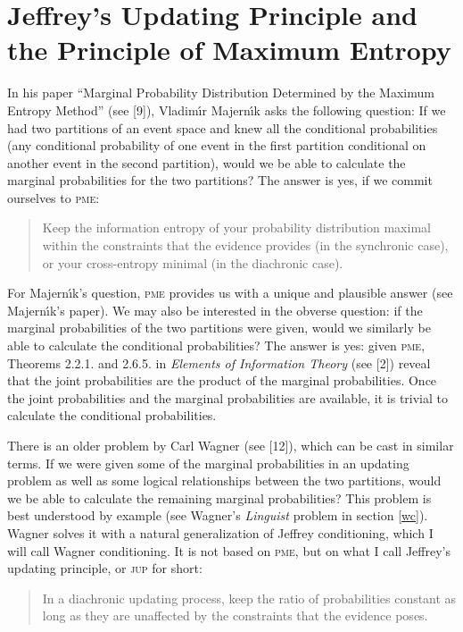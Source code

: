 \documentclass[entropy,article,submit,oneauthor,pdftex,12pt,a4paper]{mdpi}
\newcommand{\qeins}[1]{``#1''}
\newenvironment{quotex}{\begin{quote}\begin{footnotesize}}{\end{footnotesize}\end{quote}}
\begin{document}
\section{Jeffrey's Updating Principle and the Principle of Maximum Entropy}
\label{juppme}

In his paper \qeins{Marginal Probability Distribution Determined by
  the Maximum Entropy Method} (see [9]), Vladim{\'\i}r Majern{\'\i}k
asks the following question: If we had two partitions of an event
space and knew all the conditional probabilities (any conditional
probability of one event in the first partition conditional on another
event in the second partition), would we be able to calculate the
marginal probabilities for the two partitions? The answer is yes, if
we commit ourselves to \textsc{pme}:

\begin{quotex}
  [\textsc{pme}] Keep the information entropy of your probability
  distribution maximal within the constraints that the evidence
  provides (in the synchronic case), or your cross-entropy minimal (in
  the diachronic case).
\end{quotex}

For Majern{\'\i}k's question, \textsc{pme} provides us with a unique and
plausible answer (see Majern{\'\i}k's paper). We may also be interested in
the obverse question: if the marginal probabilities of the two
partitions were given, would we similarly be able to calculate the
conditional probabilities? The answer is yes: given \textsc{pme},
Theorems 2.2.1. and 2.6.5. in \emph{Elements of Information Theory}
(see [2]) reveal that the joint probabilities
are the product of the marginal probabilities. Once the joint
probabilities and the marginal probabilities are available, it is
trivial to calculate the conditional probabilities.

There is an older problem by Carl Wagner (see [12]), which can be cast
in similar terms. If we were given some of the marginal probabilities
in an updating problem as well as some logical relationships between
the two partitions, would we be able to calculate the remaining
marginal probabilities? This problem is best understood by example
(see Wagner's \emph{Linguist} problem in section \ref{wc}). Wagner
solves it with a natural generalization of Jeffrey conditioning, which
I will call Wagner conditioning. It is not based on \textsc{pme}, but
on what I call Jeffrey's updating principle, or \textsc{jup} for
short:

\begin{quotex}
  [\textsc{jup}] In a diachronic updating process, keep the ratio of
  probabilities constant as long as they are unaffected by the
  constraints that the evidence poses.
\end{quotex}
\end{document}
